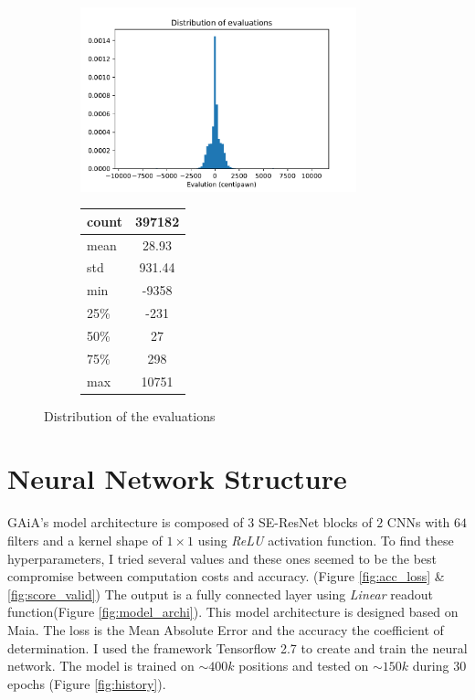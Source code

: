 \documentclass[a4paper]{article}
\begin{document}
\begin{figure}[H]
  \centering
  \begin{subfigure}{.5\textwidth}
    \centering
    \includegraphics[width=8cm]{distribution.pdf}
  \end{subfigure}%
  \begin{subfigure}{.5\textwidth}
    \centering
    \begin{tabular}{ | l | c | }
      \hline
      count & 397182 \\ \hline
      mean  & 28.93 \\ \hline
      std   &  931.44\\ \hline
      min   & -9358\\ \hline
      25\%  & -231\\ \hline
      50\%  & 27\\ \hline
      75\%  & 298\\ \hline
      max   & 10751\\ \hline
    \end{tabular}
  \end{subfigure}
  \caption{Distribution of the evaluations}
  \label{fig:distribution}
  \end{figure}

\section{Neural Network Structure}
GAiA's model architecture is composed of $3$ SE-ResNet blocks of $2$ CNNs with $64$ filters
and a kernel shape of $1\times1$ using \textit{ReLU} activation function.
To find these hyperparameters, I tried several values and these ones seemed to be
the best compromise between computation costs and accuracy.
(Figure \ref{fig:acc_loss} \& \ref{fig:score_valid})
The output is a fully connected layer using \textit{Linear} readout function(Figure \ref{fig:model_archi}).
This model architecture is designed based on Maia\cite{maia}.
The loss is the Mean Absolute Error and the accuracy the coefficient of determination.
I used the framework Tensorflow 2.7 to create and train the neural network.
The model is trained on $\sim 400k$ positions and tested on $\sim 150k$ during 30 epochs (Figure \ref{fig:history}).
\end{document}
